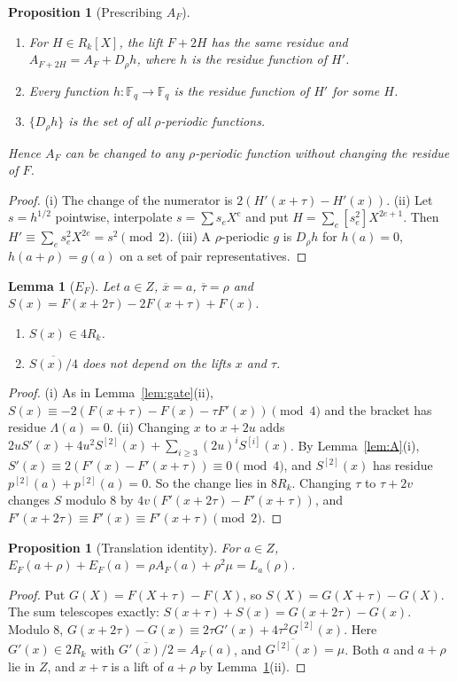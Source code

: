 \documentclass[11pt]{article}
\newtheorem{lemma}[theorem]{Lemma}
\newtheorem{proposition}[theorem]{Proposition}
\theoremstyle{definition}
\theoremstyle{remark}
\newcommand{\F}{\mathbb{F}}
\newcommand{\ol}[1]{\overline{#1}}
\begin{document}
\begin{proposition}[Prescribing $A_F$]\label{prop:Acontrol}
\begin{enumerate}[label=(\roman*)]
\item For $H\in R_k[X]$, the lift $F+2H$ has the same residue and $A_{F+2H}=A_F+D_\rho h$, where $h$ is the
residue function of $H'$.
\item Every function $h:\F_q\to\F_q$ is the residue function of $H'$ for some $H$.
\item $\{D_\rho h\}$ is the set of all $\rho$-periodic functions.
\end{enumerate}
Hence $A_F$ can be changed to any $\rho$-periodic function without changing the residue of $F$.
\end{proposition}
\begin{proof}
(i) The change of the numerator is $2(H'(x+\tau)-H'(x))$. (ii) Let $s=h^{1/2}$ pointwise, interpolate
$s=\sum s_eX^e$ and put $H=\sum_e[s_e^2]X^{2e+1}$. Then $H'\equiv\sum_es_e^2X^{2e}=s^2\pmod2$. (iii) A
$\rho$-periodic $g$ is $D_\rho h$ for $h(a)=0$, $h(a+\rho)=g(a)$ on a set of pair representatives.
\end{proof}

\begin{lemma}[$E_F$]\label{lem:E}
Let $a\in Z$, $\ol x=a$, $\ol\tau=\rho$ and $S(x)=F(x+2\tau)-2F(x+\tau)+F(x)$.
\begin{enumerate}[label=(\roman*)]
\item $S(x)\in4R_k$.
\item $\ol{S(x)/4}$ does not depend on the lifts $x$ and $\tau$.
\end{enumerate}
\end{lemma}
\begin{proof}
(i) As in Lemma~\ref{lem:gate}(ii), $S(x)\equiv-2(F(x+\tau)-F(x)-\tau F'(x))\pmod 4$ and the bracket has residue
$\Lambda(a)=0$.
(ii) Changing $x$ to $x+2u$ adds $2uS'(x)+4u^2S^{[2]}(x)+\sum_{i\ge3}(2u)^iS^{[i]}(x)$. By
Lemma~\ref{lem:A}(i), $S'(x)\equiv2(F'(x)-F'(x+\tau))\equiv0\pmod4$, and $S^{[2]}(x)$ has residue
$p^{[2]}(a)+p^{[2]}(a)=0$. So the change lies in $8R_k$. Changing $\tau$ to $\tau+2v$ changes $S$ modulo $8$
by $4v(F'(x+2\tau)-F'(x+\tau))$, and $F'(x+2\tau)\equiv F'(x)\equiv F'(x+\tau)\pmod 2$.
\end{proof}

\begin{proposition}[Translation identity]\label{prop:Etransl}
For $a\in Z$, $E_F(a+\rho)+E_F(a)=\rho A_F(a)+\rho^2\mu=L_a(\rho)$.
\end{proposition}
\begin{proof}
Put $G(X)=F(X+\tau)-F(X)$, so $S(X)=G(X+\tau)-G(X)$. The sum telescopes exactly:
$S(x+\tau)+S(x)=G(x+2\tau)-G(x)$. Modulo $8$, $G(x+2\tau)-G(x)\equiv2\tau G'(x)+4\tau^2G^{[2]}(x)$. Here
$G'(x)\in2R_k$ with $\ol{G'(x)/2}=A_F(a)$, and $\ol{G^{[2]}(x)}=\mu$. Both $a$ and $a+\rho$ lie in $Z$, and
$x+\tau$ is a lift of $a+\rho$ by Lemma~\ref{lem:E}(ii).
\end{proof}
\end{document}
